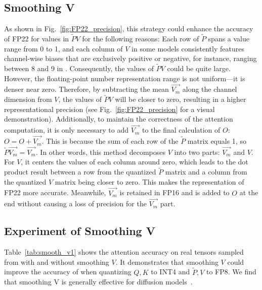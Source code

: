 \subsection{Smoothing V}  \label{sec:appendix_smooth_v}

As shown in Fig.~\ref{fig:FP22_precision}, this strategy could enhance the accuracy of FP22 for values in $\widetilde PV$ for the following reasons: Each row of $\widetilde P$ spans a value range from 0 to 1, and each column of $V$ in some models consistently features channel-wise biases that are exclusively positive or negative, for instance, ranging between 8 and 9 in \cogvideo. Consequently, the values of $\widetilde PV$ could be quite large. However, the floating-point number representation range is not uniform—it is denser near zero. Therefore, by subtracting the mean $\overrightarrow{V_m}$ along the channel dimension from $V$, the values of $\widetilde PV$ will be closer to zero, resulting in a higher representational precision (see Fig.~\ref{fig:FP22_precision} for a visual demonstration).
Additionally, to maintain the correctness of the attention computation, it is only necessary to add $\overrightarrow{V_m}$ to the final calculation of $O$: $O = O + \overrightarrow{V_m}$. This is because the sum of each row of the $\widetilde P$ matrix equals 1, so $\widetilde P\overrightarrow{V_m} = \overrightarrow{V_m}$.
In other words, this method decomposes $V$ into two parts: $\overrightarrow{V_m}$ and $V$. For $V$, it centers the values of each column around zero, which leads to the dot product result between a row from the quantized $\widetilde P$ matrix and a column from the quantized $V$ matrix being closer to zero. This makes the representation of FP22 more accurate. Meanwhile, $\overrightarrow{V_m}$ is retained in FP16 and is added to $O$ at the end without causing a loss of precision for the $\overrightarrow{V_m}$ part.

\subsection{Experiment of Smoothing V}  \label{sec:exp_of_smooth_v}
Table~\ref{tab:smooth_v1} shows the attention accuracy on real tensors sampled from \cogvideo with and without smoothing $V$. It demonstrates that smoothing $V$ could improve the accuracy of \our when quantizing $Q, K$ to INT4 and $\widetilde P, V$ to FP8. We find that smoothing V is generally effective for diffusion models~\cite{zheng2023dpm,zheng2024diffusion,zheng2024masked,zheng2025direct,zhao2024identifying,zhao2025riflex,wang2024framebridge}.

